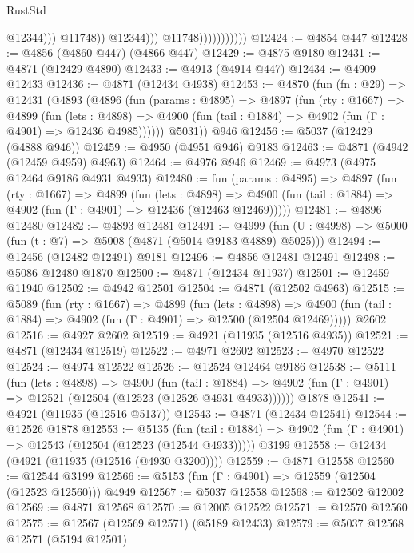 \begin{lexlean}{RustStd}
\begin{coremodule}
{\begin{coremodule}
{{{{{{{{{{{{{{{{{{{{{{{{{{{{{                                          @12344)))
                                    @11748))
                                @12344)))
                          @11748)))))))))))
@12424 := @4854 @447
@12428 := @4856 (@4860 @447) (@4866 @447)
@12429 := @4875 @9180
@12431 := @4871 (@12429 @4890)
@12433 := @4913 (@4914 @447)
@12434 := @4909 @12433
@12436 := @4871 (@12434 @4938)
@12453 := @4870
    (fun (fn : @29) =>
    @12431
      (@4893
        (@4896
          (fun (params : @4895) =>
          @4897
            (fun (rty : @1667) =>
            @4899
              (fun (lets : @4898) =>
              @4900 (fun (tail : @1884) => @4902 (fun (Γ : @4901) => @12436 @4985))))))
        @5031))
    @946
@12456 := @5037 (@12429 (@4888 @946))
@12459 := @4950 (@4951 @946) @9183
@12463 := @4871 (@4942 (@12459 @4959) @4963)
@12464 := @4976 @946
@12469 := @4973 (@4975 @12464 @9186 @4931 @4933)
@12480 := fun (params : @4895) =>
  @4897
    (fun (rty : @1667) =>
    @4899
      (fun (lets : @4898) =>
      @4900 (fun (tail : @1884) => @4902 (fun (Γ : @4901) => @12436 (@12463 @12469)))))
@12481 := @4896 @12480
@12482 := @4893 @12481
@12491 := @4999 (fun (U : @4998) => @5000 (fun (t : @7) => @5008 (@4871 (@5014 @9183 @4889) @5025)))
@12494 := @12456 (@12482 @12491) @9181
@12496 := @4856 @12481 @12491
@12498 := @5086 @12480 @1870
@12500 := @4871 (@12434 @11937)
@12501 := @12459 @11940
@12502 := @4942 @12501
@12504 := @4871 (@12502 @4963)
@12515 := @5089
    (fun (rty : @1667) =>
    @4899
      (fun (lets : @4898) =>
      @4900 (fun (tail : @1884) => @4902 (fun (Γ : @4901) => @12500 (@12504 @12469)))))
    @2602
@12516 := @4927 @2602
@12519 := @4921 (@11935 (@12516 @4935))
@12521 := @4871 (@12434 @12519)
@12522 := @4971 @2602
@12523 := @4970 @12522
@12524 := @4974 @12522
@12526 := @12524 @12464 @9186
@12538 := @5111
    (fun (lets : @4898) =>
    @4900
      (fun (tail : @1884) =>
      @4902 (fun (Γ : @4901) => @12521 (@12504 (@12523 (@12526 @4931 @4933))))))
    @1878
@12541 := @4921 (@11935 (@12516 @5137))
@12543 := @4871 (@12434 @12541)
@12544 := @12526 @1878
@12553 := @5135
    (fun (tail : @1884) => @4902 (fun (Γ : @4901) => @12543 (@12504 (@12523 (@12544 @4933)))))
    @3199
@12558 := @12434 (@4921 (@11935 (@12516 (@4930 @3200))))
@12559 := @4871 @12558
@12560 := @12544 @3199
@12566 := @5153 (fun (Γ : @4901) => @12559 (@12504 (@12523 @12560))) @4949
@12567 := @5037 @12558
@12568 := @12502 @12002
@12569 := @4871 @12568
@12570 := @12005 @12522
@12571 := @12570 @12560
@12575 := @12567 (@12569 @12571) (@5189 @12433)
@12579 := @5037 @12568 @12571 (@5194 @12501)
}}}}}}}}}}}}}}}}}}}}}}}}}}}}}
\end{coremodule}}
\end{coremodule}
\end{lexlean}
